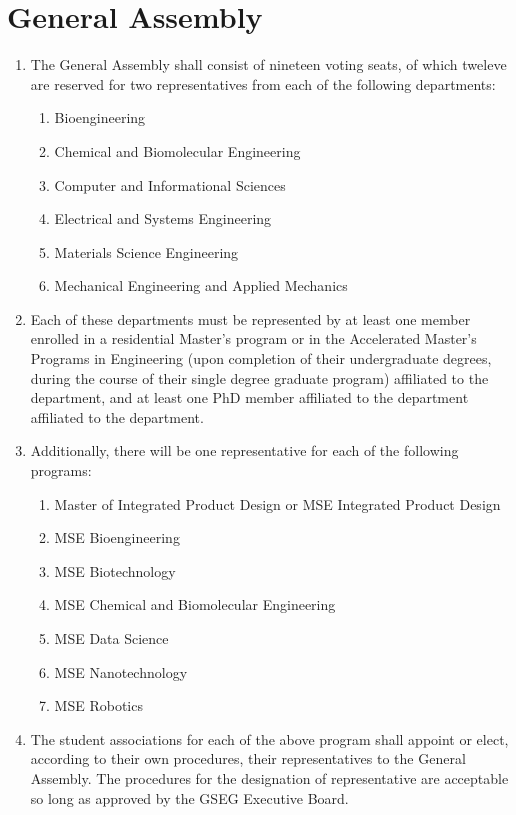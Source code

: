 \chapter{General Assembly}
\label{art:assembly}

\begin{enumerate}[label=\Alph*.]

	\item The General Assembly shall consist of nineteen voting seats, of which tweleve are reserved for two representatives from each of the following departments:
	\begin{enumerate}[label=(\roman*)]
		\item Bioengineering
		\item Chemical and Biomolecular Engineering
		\item Computer and Informational Sciences
		\item Electrical and Systems Engineering
		\item Materials Science Engineering
		\item Mechanical Engineering and Applied Mechanics
	\end{enumerate}

	\item Each of these departments must be represented by at least one member enrolled in a residential Master's program or in the Accelerated Master’s Programs in Engineering (upon completion of their undergraduate degrees, during the course of their single degree graduate program) affiliated to the department, and at least one PhD member affiliated to the department affiliated to the department. 

	\item Additionally, there will be one representative for each of the following programs:
	\begin{enumerate}[label=(\roman*)]
		\item Master of Integrated Product Design or MSE Integrated Product Design
		\item MSE Bioengineering
		\item MSE Biotechnology
		\item MSE Chemical and Biomolecular Engineering
		\item MSE Data Science
		\item MSE Nanotechnology
		\item MSE Robotics
	\end{enumerate}

	\item The student associations for each of the above program shall appoint or elect, according
	to their own procedures, their representatives to the General Assembly. The procedures for the
	designation of representative are acceptable so long as approved by the GSEG Executive Board.


\end{enumerate}
